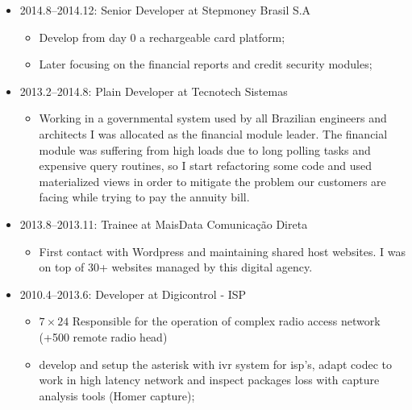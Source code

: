 \documentclass[
]{article}
\providecommand{\tightlist}{%
  \setlength{\itemsep}{0pt}\setlength{\parskip}{0pt}}
\begin{document}
\vspace{2mm}

\begin{itemize}
\tightlist
\item
  2014.8--2014.12: Senior Developer at Stepmoney Brasil S.A

  \begin{itemize}
  \tightlist
  \item
    Develop from day 0 a rechargeable card platform;
  \item
    Later focusing on the financial reports and credit security modules;
  \end{itemize}
\end{itemize}

\vspace{2mm}

\begin{itemize}
\tightlist
\item
  2013.2--2014.8: Plain Developer at Tecnotech Sistemas

  \begin{itemize}
  \tightlist
  \item
    Working in a governmental system used by all Brazilian engineers and
    architects I was allocated as the financial module leader. The
    financial module was suffering from high loads due to long polling
    tasks and expensive query routines, so I start refactoring some code
    and used materialized views in order to mitigate the problem our
    customers are facing while trying to pay the annuity bill.
  \end{itemize}
\end{itemize}

\vspace{2mm}

\begin{itemize}
\tightlist
\item
  2013.8--2013.11: Trainee at MaisData Comunicação Direta

  \begin{itemize}
  \tightlist
  \item
    First contact with Wordpress and maintaining shared host websites. I
    was on top of 30+ websites managed by this digital agency.
  \end{itemize}
\end{itemize}

\vspace{2mm}

\begin{itemize}
\tightlist
\item
  2010.4--2013.6: Developer at Digicontrol - ISP

  \begin{itemize}
  \tightlist
  \item
    \(7 \times 24\) Responsible for the operation of complex radio
    access network (+500 remote radio head)
  \item
    develop and setup the asterisk with ivr system for isp's, adapt
    codec to work in high latency network and inspect packages loss with
    capture analysis tools (Homer capture);
  \end{itemize}
\end{itemize}
\end{document}
